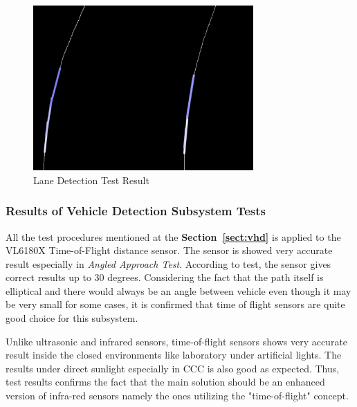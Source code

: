 \documentclass[a4paper,12pt]{article}
\begin{document}
\begin{figure}[h]

\includegraphics[width=0.75\textwidth,center]{images/laneD_test}

\caption{Lane Detection Test Result \label{fig:laneD_test} }

\end{figure}




\subsubsection*{Results of Vehicle Detection Subsystem Tests}



All the test procedures mentioned at the \textbf{Section~\ref{sect:vhd}} is applied to the VL6180X Time-of-Flight distance sensor. The sensor is showed very accurate result especially in \textit{Angled Approach Test}. According to test, the sensor gives correct results up to 30 degrees. Considering the fact that the path itself is elliptical and there would always be an angle between vehicle even though it may be very small for some cases, it is confirmed that time of flight sensors are quite good choice for this subsystem.


Unlike ultrasonic and infrared sensors, time-of-flight sensors shows very accurate result inside the closed environments like laboratory under artificial lights. The results under direct sunlight especially in CCC is also good as expected.  Thus, test results confirms the fact that the main solution should be an enhanced version of infra-red sensors namely the ones utilizing the "time-of-flight" concept. 
\end{document}
